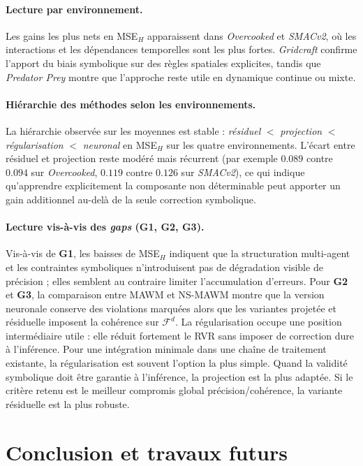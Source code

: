 \documentclass[final]{jfsma}
\theoremstyle{plain}
\theoremstyle{definition}
\theoremstyle{remark}
\begin{document}
\paragraph{Lecture par environnement.}
Les gains les plus nets en MSE$_H$ apparaissent dans \emph{Overcooked} et \emph{SMACv2}, où les interactions et les dépendances temporelles sont les plus fortes. \emph{Gridcraft} confirme l'apport du biais symbolique sur des règles spatiales explicites, tandis que \emph{Predator Prey} montre que l'approche reste utile en dynamique continue ou mixte.

\paragraph{Hiérarchie des méthodes selon les environnements.}
La hiérarchie observée sur les moyennes est stable : \textit{résiduel} $<$ \textit{projection} $<$ \textit{régularisation} $<$ \textit{neuronal} en MSE$_H$ sur les quatre environnements. L'écart entre résiduel et projection reste modéré mais récurrent (par exemple $0.089$ contre $0.094$ sur \emph{Overcooked}, $0.119$ contre $0.126$ sur \emph{SMACv2}), ce qui indique qu'apprendre explicitement la composante non déterminable peut apporter un gain additionnel au-delà de la seule correction symbolique.

\paragraph{Lecture vis-à-vis des \emph{gaps} (G1, G2, G3).}
Vis-à-vis de \textbf{G1}, les baisses de MSE$_H$ indiquent que la structuration multi-agent et les contraintes symboliques n'introduisent pas de dégradation visible de précision ; elles semblent au contraire limiter l'accumulation d'erreurs. Pour \textbf{G2} et \textbf{G3}, la comparaison entre MAWM et NS-MAWM montre que la version neuronale conserve des violations marquées alors que les variantes projetée et résiduelle imposent la cohérence sur $\mathcal{F}^d$. La régularisation occupe une position intermédiaire utile : elle réduit fortement le RVR sans imposer de correction dure à l'inférence.
%
Pour une intégration minimale dans une chaîne de traitement existante, la régularisation est souvent l'option la plus simple. Quand la validité symbolique doit être garantie à l'inférence, la projection est la plus adaptée. Si le critère retenu est le meilleur compromis global précision/cohérence, la variante résiduelle est la plus robuste.


\section{Conclusion et travaux futurs}
\label{sec:conclusion}
\end{document}
